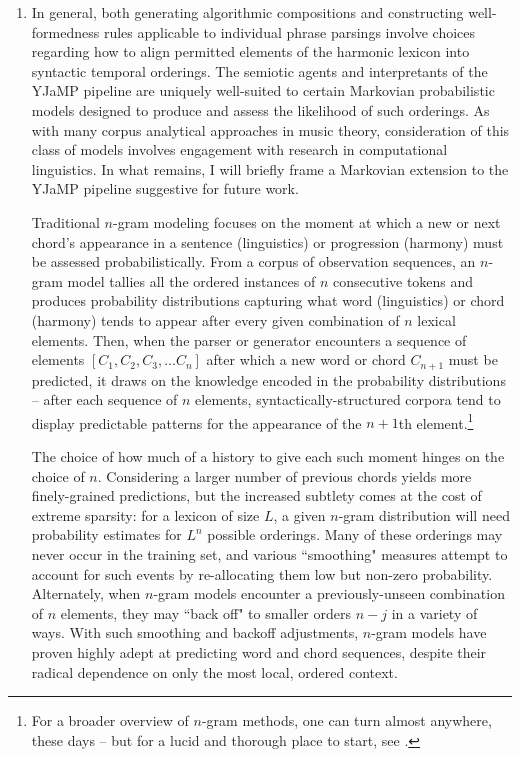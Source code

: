 \begin{enumerate}
	\item In general, both generating algorithmic compositions and constructing well-formedness rules applicable to individual phrase parsings involve choices regarding how to align permitted elements of the harmonic lexicon into syntactic temporal orderings.  The semiotic agents and interpretants of the YJaMP pipeline are uniquely well-suited to certain Markovian probabilistic models designed to produce and assess the likelihood of such orderings.  As with many corpus analytical approaches in music theory, consideration of this class of models involves engagement with research in computational linguistics.  In what remains, I will briefly frame a Markovian extension to the YJaMP pipeline suggestive for future work.
	
Traditional $n$-gram modeling focuses on the moment at which a new or next chord's appearance in a sentence (linguistics) or progression (harmony) must be assessed probabilistically.  From a corpus of observation sequences, an $n$-gram model tallies all the ordered instances of $n$ consecutive tokens and produces probability distributions capturing what word (linguistics) or chord (harmony) tends to appear after every given combination of $n$ lexical elements.  Then, when the parser or generator encounters a sequence of elements $[C_1,C_2,C_3,...C_n]$ after which a new word or chord $C_{n+1}$ must be predicted, it draws on the knowledge encoded in the probability distributions -- after each sequence of $n$ elements, syntactically-structured corpora tend to display predictable patterns for the appearance of the $n+1$th element.\footnote{For a broader overview of $n$-gram methods, one can turn almost anywhere, these days -- but for a lucid and thorough place to start, see \cite{jurafsky2000}.}

The choice of how much of a history to give each such moment hinges on the choice of $n$.  Considering a larger number of previous chords yields more finely-grained predictions, but the increased subtlety comes at the cost of extreme sparsity: for a lexicon of size $L$, a given $n$-gram distribution will need probability estimates for $L^n$ possible orderings.  Many of these orderings may never occur in the training set, and various ``smoothing" measures attempt to account for such events by re-allocating them low but non-zero probability.  Alternately, when $n$-gram models encounter a previously-unseen combination of $n$ elements, they may ``back off" to smaller orders $n-j$ in a variety of ways.  With such smoothing and backoff adjustments, $n$-gram models have proven highly adept at predicting word and chord sequences, despite their radical dependence on only the most local, ordered context.


\end{enumerate}
